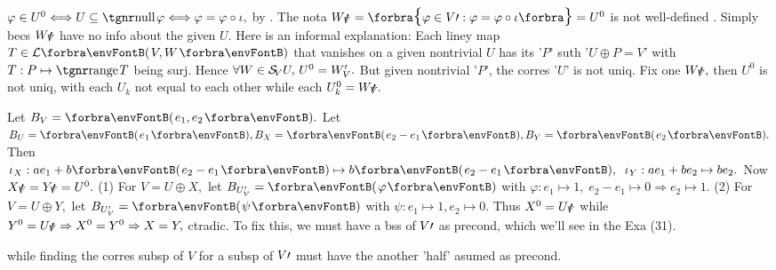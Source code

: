 $\varphi\in U^0\Longleftrightarrow U\subseteq\null\varphi\Longleftrightarrow\varphi=\varphi\circ\iota,$ by .\PfEnd\vspace{3pt}
\ANote The nota $W_V\upapostrophe=\Bra{\varphi\in V\apostrophe:\varphi=\varphi\circ\iota}=U^0$ is not well-defined .\parNot
Simply becs $W_V\!\!\!\prime\,$ have no info about the given $U.$ Here is an informal explanation:\parNot
Each liney map $T\in\Lm{V,W}$ that vanishes on a given nontrivial $U$ has its '$P$'\parNot
{} suth '$U\oplus P=V$' with $T:P\mapsto\range T$ being surj.\parNot
Hence $\forall W\in\mathcal{S}_{\!V}U,\,U^0=W_{V}'.$ But given nontrivial '$P$', the corres '$U$' is not uniq.\parNot
Fix one $W_V\!\!\!\prime\,,$ then $U^0$ is not uniq, with each $U_k$ not equal to each other while each $U_k^0=W_V\!\!\!\prime\,.$\par\vspace{2pt}
\AExa Let $B_V=\Par{e_1,e_2}.$ Let $B_U=\Par{e_1},B_X=\Par{e_2-e_1},B_Y=\Par{e_2}.$\parExa
Then $\iota_X:ae_1+b\Par{e_2-e_1}\mapsto b\Par{e_2-e_1},\;\;\iota_Y:ae_1+be_2\mapsto be_2.$ Now $X_V\!\!\!\prime\,=Y_V\!\!\!\prime\,=U^0.$\parExa
(1) For $V=U\oplus X,$ let $B_{U_V'}=\Par{\varphi}$ with $\varphi:e_1\mapsto 1,\;e_2-e_1\mapsto 0\Rightarrow e_2\mapsto 1.$\parExa
(2) For $V=U\oplus Y,$ let $B_{U_V'}=\Par{\psi}$ with $\psi:e_1\mapsto 1,e_2\mapsto 0.$\parExa
Thus $X^0=U_V\!\!\!\prime\,$ while $Y^0=U_V\!\!\!\prime\,\Rightarrow X^0=Y^0\Rightarrow X=Y,$ ctradic.\parExa
To fix this, we must have a bss of $V\prime$ as precond, which we'll see in the {\NOTEFOR} Exa (31).\par\vspace{2pt}
\vspace{-2pt}\parNot
{\tgsl while finding the corres subsp of $V$ for a subsp of $V\prime$ must have the another 'half' asumed as precond.}
\SepLine

